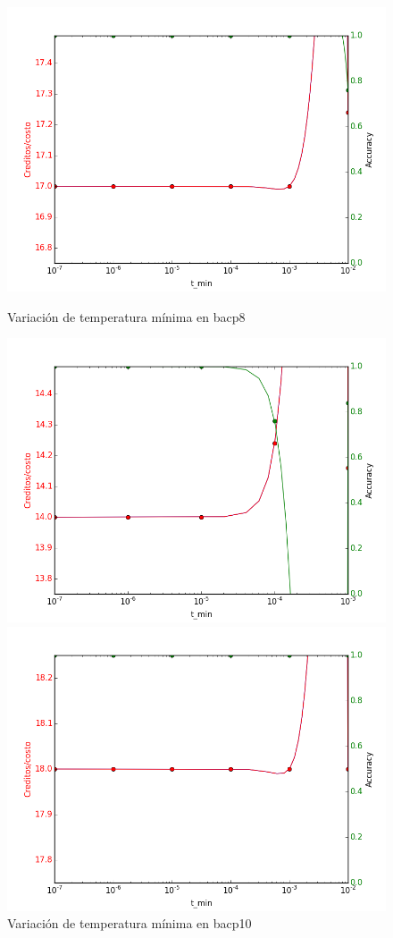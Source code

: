 \documentclass[letterpaper,10pt]{article}
\begin{document}
\begin{figure}[H]
        \includegraphics[width=\linewidth]{img/3-tmin-bacp8.png}
        \caption{Variación de temperatura mínima en bacp8}
        \label{fig:tmin1}
    \endminipage\hfill
        \includegraphics[width=\linewidth]{img/3-tmin-bacp10.png}
        \caption{Variación de temperatura mínima en bacp10}
        \label{fig:tmin2}
    \endminipage\hfill
    \includegraphics[width=\linewidth]{img/3-tmin-bacp12.png}

\end{figure}
\end{document}
